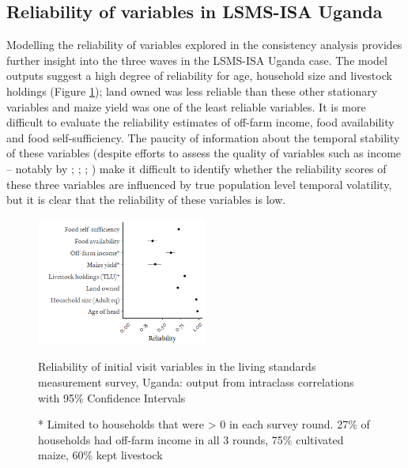 \subsection{Reliability of variables in LSMS-ISA Uganda}

Modelling the reliability of variables explored in the consistency analysis provides further insight into the three waves in the LSMS-ISA Uganda case. The model outputs suggest a high degree of reliability for age, household size and livestock holdings (Figure \ref{fig:03_4}); land owned was less reliable than these other stationary variables and maize yield was one of the least reliable variables. It is more difficult to evaluate the reliability estimates of off-farm income, food availability and food self-sufficiency. The paucity of information about the temporal stability of these variables (despite efforts to assess the quality of variables such as income -- notably by \citealp{Neri2012}; \citealp{Fisher2010}; \citealp{Juster2007}; \citealp{Moore2000}) make it difficult to identify whether the reliability scores of these three variables are influenced by true population level temporal volatility, but it is clear that the reliability of these variables is low.

\begin{figure}[H]
  \includegraphics[width=0.5\textwidth]{figs_03/image4.png}
  \captionsetup{singlelinecheck = off, justification=justified}
    \caption{Reliability of initial visit variables in the living standards measurement survey, Uganda: output from intraclass correlations with 95\% Confidence Intervals}
  \label{fig:03_4}
  \small
  \vspace*{-3mm}
  \caption*{* Limited to households that were {\textgreater} 0 in each survey round. 27\% of households had off-farm income in all 3 rounds, 75\% cultivated maize, 60\% kept livestock}
\end{figure}




